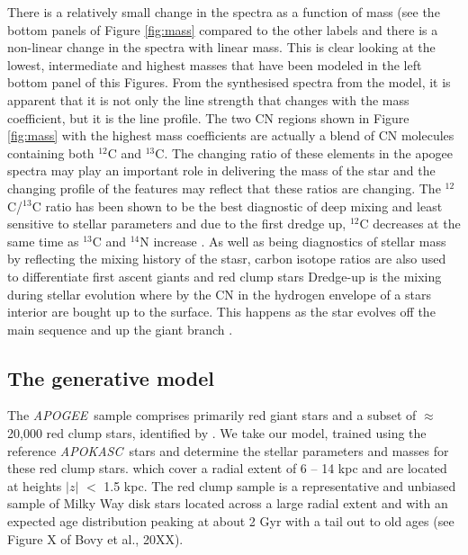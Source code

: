 \documentclass[12pt, preprint]{aastex}
\newcommand{\project}[1]{\textsl{#1}}
\newcommand{\tc}{\project{The~Cannon}}
\newcommand{\apogee}{\project{APOGEE}}
\newcommand{\apokasc}{\project{APOKASC}}
\begin{document}
There is a relatively small change in the spectra as a function of mass (see the bottom panels of Figure \ref{fig:mass} compared to the other labels and there is a non-linear change in the spectra with linear mass. This is clear looking at the lowest, intermediate and highest masses that have been modeled in the left bottom panel of this Figures. From the synthesised spectra from the model, it is apparent that it is not only the line strength that changes with the mass coefficient, but it is the line profile. The two CN regions shown in Figure \ref{fig:mass} with the highest mass coefficients are actually a blend of CN molecules containing both $^{12}$C and $^{13}$C. The changing ratio of these elements in the apogee spectra may play an important role in delivering the mass of the star and the changing profile of the features may reflect that these ratios are changing. The $^{12}$C/$^{13}$C ratio has been shown to be the best diagnostic of deep mixing and least sensitive to stellar parameters and due to the first dredge up, $^{12}$C decreases at the same time as $^{13}$C and $^{14}$N increase \citep{Taut2010}.  As well as being diagnostics of stellar mass by reflecting the mixing history of the stasr, carbon isotope ratios are also used to differentiate first ascent giants and red clump stars \citep[see][and references therein]{Taut2013} Dredge-up is the mixing during stellar evolution where by the CN in the hydrogen envelope of a stars interior are bought up to the surface. This happens as the star evolves off the main sequence and up the giant branch \citep{Gilroy1991}. 







\subsection{The generative model}

The \apogee\ sample comprises primarily red giant stars and a subset of  $\approx$ 20,000 red clump stars, identified by \citet{Bovy2014}. We take our model, trained using the reference \apokasc\ stars and determine the stellar parameters and masses for these red clump stars. which cover a radial extent of 6 -- 14 kpc and are located at heights $|z|$ $<$ 1.5 kpc. The red clump sample is a representative and unbiased sample of Milky Way disk stars located across a large radial extent and with an expected age distribution peaking at about 2 Gyr with a tail out to old ages (see Figure X of Bovy et al., 20XX). 
\end{document}
